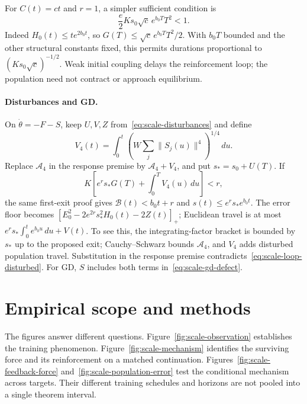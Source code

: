 For $C(t)=ct$ and $r=1$, a simpler sufficient condition is
\begin{equation}
\frac e2 K s_0\sqrt c\,e^{b_0T}T^2<1.
\label{eq:scale-loop-clock}
\end{equation}
Indeed $H_0(t)\le t e^{2b_0t}$, so
$G(T)\le\sqrt c\,e^{b_0T}T^2/2$. With $b_0T$ bounded and the other
structural constants fixed, this permits durations proportional to
$(K s_0\sqrt c)^{-1/2}$. Weak initial coupling delays the reinforcement
loop; the population need not contract or approach equilibrium.

\paragraph{Disturbances and GD.}
On $\dot\theta=-F-S$, keep $U,V,Z$ from~\eqref{eq:scale-disturbances}
and define
\begin{equation}
V_4(t)=\int_0^t\left(W\sum_j\|S_j(u)\|^4\right)^{1/4}\,du.
\end{equation}
Replace $\mathcal A_4$ in the response premise by
$\mathcal A_4+V_4$, and put $s_*=s_0+U(T)$. If
\begin{equation}
K\left[e^r s_*G(T)+\int_0^T V_4(u)\,du\right]<r,
\label{eq:scale-loop-disturbed}
\end{equation}
the same first-exit proof gives $\mathcal B(t)<b_0t+r$ and
$s(t)\le e^r s_*e^{b_0t}$. The error floor becomes
$[E_0^2-2e^{2r}s_*^2H_0(t)-2Z(t)]_+$; Euclidean travel is at most
$e^r s_*\int_0^t e^{b_0u}\,du+V(t)$. To see this, the integrating-factor
bracket is bounded by $s_*$ up to the proposed exit; Cauchy--Schwarz bounds
$\mathcal A_4$, and $V_4$ adds disturbed population travel. Substitution
in the response premise contradicts~\eqref{eq:scale-loop-disturbed}.
For GD, $S$ includes both terms in~\eqref{eq:scale-gd-defect}.

\section{Empirical scope and methods}
\label{app:scale-experiments}

The figures answer different questions. Figure~\ref{fig:scale-observation}
establishes the training phenomenon. Figure~\ref{fig:scale-mechanism}
identifies the surviving force and its reinforcement on a matched
continuation. Figures~\ref{fig:scale-feedback-force}
and~\ref{fig:scale-population-error} test the conditional mechanism across
targets. Their different training schedules and horizons are not pooled
into a single theorem interval.

